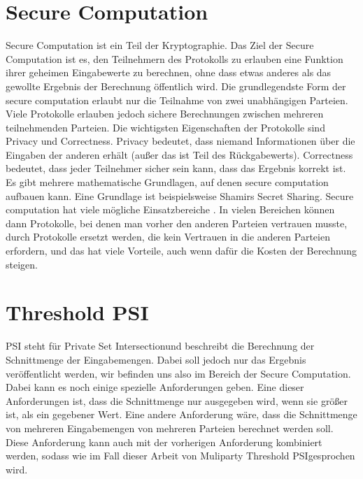 \section{Secure Computation}
Secure Computation ist ein Teil der Kryptographie. Das Ziel der Secure Computation ist es, den Teilnehmern des Protokolls zu erlauben eine Funktion ihrer geheimen Eingabewerte zu berechnen, ohne dass etwas anderes als das gewollte Ergebnis der Berechnung öffentlich wird. \cite{cryptoeprint:2020:300} Die grundlegendste Form der secure computation erlaubt nur die Teilnahme von zwei unabhängigen Parteien. Viele Protokolle erlauben jedoch sichere Berechnungen zwischen mehreren teilnehmenden Parteien. Die wichtigsten Eigenschaften der Protokolle sind Privacy und Correctness. Privacy bedeutet, dass niemand Informationen über die Eingaben der anderen erhält (außer das ist Teil des Rückgabewerts). Correctness bedeutet, dass jeder Teilnehmer sicher sein kann, dass das Ergebnis korrekt ist. \cite{cryptoeprint:2020:300} Es gibt mehrere mathematische Grundlagen, auf denen secure computation aufbauen kann. Eine Grundlage ist beispielsweise Shamirs Secret Sharing. Secure computation hat viele mögliche Einsatzbereiche \cite{cryptoeprint:2020:300}. In vielen Bereichen können dann Protokolle, bei denen man vorher den anderen Parteien vertrauen musste, durch Protokolle ersetzt werden, die kein Vertrauen in die anderen Parteien erfordern, und das hat viele Vorteile, auch wenn dafür die Kosten der Berechnung steigen.

\section{Threshold PSI}
PSI steht für \glqq Private Set Intersection\grqq und beschreibt die Berechnung der Schnittmenge der Eingabemengen. Dabei soll jedoch nur das Ergebnis veröffentlicht werden, wir befinden uns also im Bereich der Secure Computation.
Dabei kann es noch einige spezielle Anforderungen geben. Eine dieser Anforderungen ist, dass die Schnittmenge nur ausgegeben wird, wenn sie größer ist, als ein gegebener Wert. Eine andere Anforderung wäre, dass die Schnittmenge von mehreren Eingabemengen von mehreren Parteien berechnet werden soll. 
Diese Anforderung kann auch mit der vorherigen Anforderung kombiniert werden, sodass wie im Fall dieser Arbeit von \glqq Muliparty Threshold PSI\grqq gesprochen wird.

